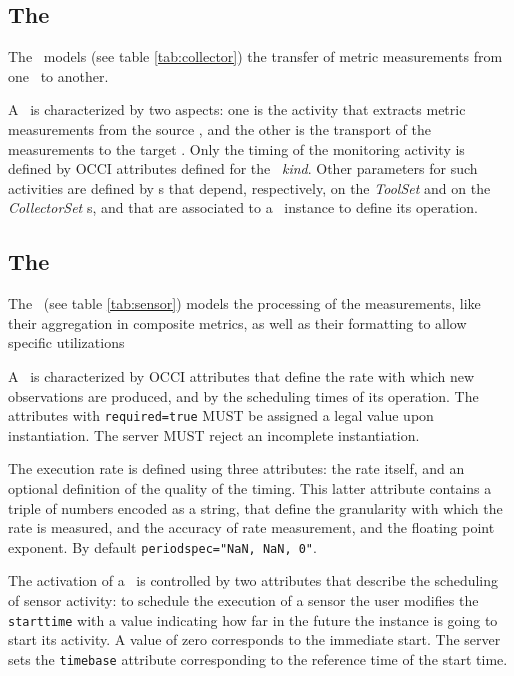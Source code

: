 \documentclass[12pt]{article}  %
\begin{document}


\subsection{The \coll}



The \coll\ models  (see table \ref{tab:collector}) the transfer of metric measurements from one \rs\ to another.

A \coll\ is characterized by two aspects: one is the activity that extracts metric measurements from the source \rs, and the other is the transport of the measurements to the target \rs. Only the timing of the monitoring activity is defined by OCCI attributes defined for the \coll\ {\em kind}. Other parameters for such activities are defined by \mi s that depend, respectively, on the {\em ToolSet} and on the {\em CollectorSet} \mi s, and that are associated to a \coll\ instance to define its operation. 

\subsection{The \sens \label{sec:sensor}}



The \sens\ (see table \ref{tab:sensor}) models the processing of the measurements, like their aggregation in composite metrics, as well as their formatting to allow specific utilizations

A \sens\ is characterized by OCCI attributes that define the rate with which new observations are produced, and by the scheduling times of its operation. The attributes with \verb|required=true| MUST be assigned a legal value upon instantiation. The server MUST reject an incomplete instantiation.

The execution rate is defined using three attributes: the rate itself, and an optional definition of the quality of the timing. This latter attribute contains a triple of numbers encoded as a string, that define the granularity with which the rate is measured, and the accuracy of rate measurement, and the floating point exponent. By default \verb|periodspec="NaN, NaN, 0"|.

The activation of a \sens\ is controlled by two attributes that describe the scheduling of sensor activity: to schedule the execution of a sensor the user modifies the {\tt starttime} with a value indicating how far in the future the instance is going to start its activity. A value of zero corresponds to the immediate start. The server sets the {\tt timebase} attribute corresponding to the reference time of the start time.
\end{document}
